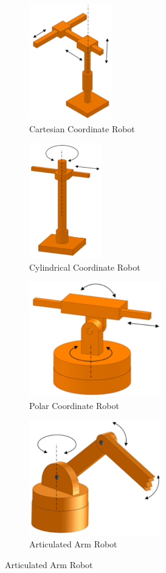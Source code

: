 \begin{spacing}{2}
\begin{figure}[h]
\begin{subfigure}{0.5\textwidth}
\includegraphics[width=0.9\linewidth, height=5cm]{image/cartesian.eps} 
\caption{Cartesian Coordinate Robot}
\end{subfigure}
\begin{subfigure}{0.5\textwidth}
\includegraphics[width=0.9\linewidth, height=5cm]{image/cylindrical.eps}
\caption{Cylindrical Coordinate Robot}
\end{subfigure}
 
 \begin{subfigure}{0.5\textwidth}
\includegraphics[width=0.9\linewidth, height=5cm]{image/polar.eps} 
\caption{Polar Coordinate Robot}
\end{subfigure}
\begin{subfigure}{0.5\textwidth}
\includegraphics[width=0.9\linewidth, height=5cm]{image/articulated.eps}
\caption{Articulated Arm Robot}
\end{subfigure}


\end{figure}
\end{spacing}
